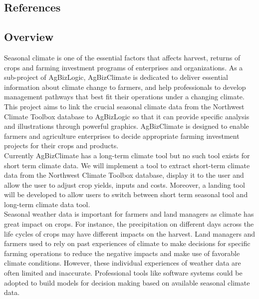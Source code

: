 \documentclass[onecolumn, draftclsnofoot,10pt, compsoc]{article}
\begin{document}
			\renewcommand\refname{\vskip -1cm}
		\subsection{References}

		\nocite{*}
    
    


		\subsection{Overview}
			Seasonal climate is one of the essential factors that affects harvest, returns of crops and farming investment programs of enterprises and organizations. As a sub-project of AgBizLogic, AgBizClimate is dedicated to deliver essential information about climate change to farmers, and help professionals to develop management pathways that best fit their operations under a changing climate. This project aims to link the crucial seasonal climate data from the Northwest Climate Toolbox database to AgBizLogic so that it can provide specific analysis and illustrations through powerful graphics. AgBizClimate is designed to enable farmers and agriculture enterprises to decide appropriate farming investment projects for their crops and products.\\
		
            Currently AgBizClimate has a long-term climate tool but no such tool exists for short term climate data. We will implement a tool to extract short-term climate data from the Northwest Climate Toolbox database, display it to the user and allow the user to adjust crop yields, inputs and costs. Moreover, a landing tool will be developed to allow users to switch between short term seasonal tool and long-term climate data tool.\\
        
            Seasonal weather data is important for farmers and land managers as climate has great impact on crops. For instance, the precipitation on different days across the life cycles of crops may have different impacts on the harvest. Land managers and farmers used to rely on past experiences of climate to make decisions for specific farming operations to reduce the negative impacts and make use of favorable climate conditions. However, these individual experiences of weather data are often limited and inaccurate. Professional tools like software systems could be adopted to build models for decision making based on available seasonal climate data.\\
            
\end{document}

